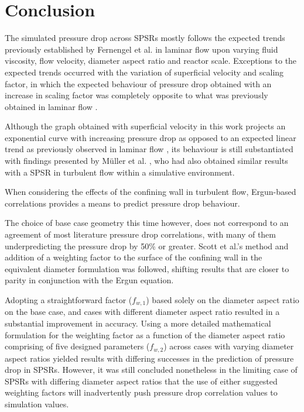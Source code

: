 \chapter{Conclusion}
The simulated pressure drop across SPSRs mostly follows the expected trends previously established by Fernengel et al. in laminar flow \cite{Fernengel2020} upon varying fluid viscosity, flow velocity, diameter aspect ratio and reactor scale. Exceptions to the expected trends occurred with the variation of superficial velocity and scaling factor, in which the expected behaviour of pressure drop obtained with an increase in scaling factor was completely opposite to what was previously obtained in laminar flow \cite{Fernengel2020}. 

Although the graph obtained with superficial velocity in this work projects an exponential curve with increasing pressure drop as opposed to an expected linear trend as previously observed in laminar flow \cite{Fernengel2020}, its behaviour is still substantiated with findings presented by M\"{u}ller et al. \cite{Mueller2012}, who had also obtained similar results with a SPSR in turbulent flow within a simulative environment.

When considering the effects of the confining wall in turbulent flow, Ergun-based correlations provides a means to predict pressure drop behaviour.

The choice of base case geometry this time however, does not correspond to an agreement of most literature pressure drop correlations, with many of them underpredicting the pressure drop by 50\% or greater. Scott et al.'s \cite{Scott1974} method and addition of a weighting factor to the surface of the confining wall in the equivalent diameter formulation was followed, shifting results that are closer to parity in conjunction with the Ergun equation. 

Adopting a straightforward factor ($f_{w,1}$) based solely on the diameter aspect ratio on the base case, and cases with different diameter aspect ratio resulted in a substantial improvement in accuracy. Using a more detailed mathematical formulation for the weighting factor as a function of the diameter aspect ratio comprising of five designed parameters ($f_{w,2}$) across cases with varying diameter aspect ratios yielded results with differing successes in the prediction of pressure drop in SPSRs. However, it was still concluded nonetheless in the limiting case of SPSRs with differing diameter aspect ratios that the use of either suggested weighting factors will inadvertently push pressure drop correlation values to simulation values.

